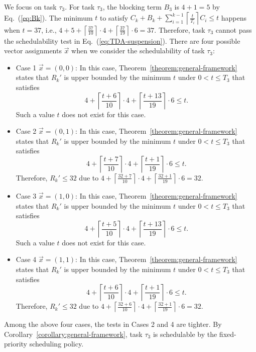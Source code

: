 \documentclass[10pt,conference,preprint]{IEEEtran}
\newcommand{\ceiling}[1]{\left\lceil{#1}\right\rceil}
\begin{document}
We focus on task $\tau_3$.  
For task $\tau_3$, the blocking term $B_3$ is $4+1=5$ by
Eq.~(\ref{eq:Bk}). The minimum $t$ to satisfy $C_k + B_k +
\sum_{i=1}^{k-1}\ceiling{\frac{t}{T_i}} C_i \leq t$ happens when $t=37$, i.e., $4+5+\ceiling{\frac{37}{10}}\cdot 4+\ceiling{\frac{37}{19}}\cdot 6=37$. Therefore, task $\tau_3$ cannot pass the schedulability test in Eq.~(\ref{eq:TDA-suspension}).
There are four
possible vector assignments $\vec{x}$ when we consider the schedulability of task $\tau_3$:
\begin{itemize}
\item Case 1 $\vec{x} = (0 , 0)$: In this case, Theorem~\ref{theorem:general-framework} states that $R_k'$ is upper bounded by the minimum $t$ under $0 < t \leq T_3$ that
   satisfies 
   {\small \begin{equation}\label{eq:example-case1} 
       4+ \ceiling{\frac{t+6}{10}}\cdot 4 + \ceiling{\frac{t+13}{19}}\cdot 6 \leq t.
     \end{equation}}Such a value $t$ does not exist for this case.
\item Case 2 $\vec{x} = (0 , 1)$:
 In this case, Theorem~\ref{theorem:general-framework} states that $R_k'$ is upper bounded by  the minimum $t$
under $0 < t \leq T_3$ that
   satisfies 
   {\small \begin{equation}\label{eq:example-case2} 
       4+ \ceiling{\frac{t+7}{10}}\cdot 4 + \ceiling{\frac{t+1}{19}}\cdot 6 \leq t.
     \end{equation}}Therefore, $R_k' \leq 32$ due to $4+ \ceiling{\frac{32+7}{10}}\cdot 4 + \ceiling{\frac{32+1}{19}}\cdot 6=32$.
\item Case 3 $\vec{x} = (1 , 0)$:
 In this case, Theorem~\ref{theorem:general-framework} states that $R_k'$ is upper bounded by  the minimum $t$
under $0 < t \leq T_3$ that
   satisfies 
   {\small \begin{equation}\label{eq:example-case3} 
       4+ \ceiling{\frac{t+5}{10}}\cdot 4 + \ceiling{\frac{t+13}{19}}\cdot 6 \leq t.
     \end{equation}}Such a value $t$ does not exist for this case.
\item Case 4 $\vec{x} = (1 , 1)$:
 In this case, Theorem~\ref{theorem:general-framework} states that $R_k'$ is upper bounded by  the minimum $t$
under $0 < t \leq T_3$ that
   satisfies 
   {\small \begin{equation}\label{eq:example-case4} 
       4+ \ceiling{\frac{t+6}{10}}\cdot 4 + \ceiling{\frac{t+1}{19}}\cdot 6 \leq t.
     \end{equation}}Therefore, $R_k' \leq 32$ due to $4+ \ceiling{\frac{32+6}{10}}\cdot 4 + \ceiling{\frac{32+1}{19}}\cdot 6=32$.
\end{itemize}
Among the above four cases, the tests in Cases 2 and 4 are tighter. By
Corollary~\ref{corollary:general-framework}, task $\tau_3$ is
schedulable by the fixed-priority scheduling policy.
\end{document}
